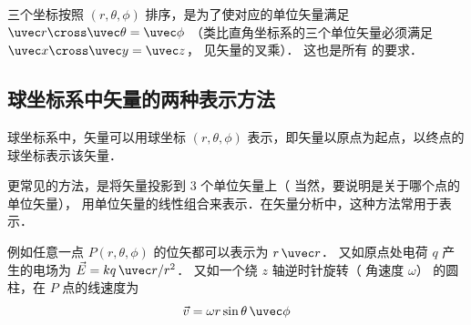 三个坐标按照 $(r, \theta , \phi )$ 排序，是为了使对应的单位矢量满足 $\uvec r \cross \uvec \theta  = \uvec \phi $ （类比直角坐标系的三个单位矢量必须满足 $\uvec x \cross \uvec y = \uvec z$， 见矢量的叉乘）． 这也是所有%
 的要求．
 
\subsection{球坐标系中矢量的两种表示方法}
球坐标系中，矢量可以用球坐标 $(r, \theta, \phi)$ 表示，即矢量以原点为起点，以终点的球坐标表示该矢量．

更常见的方法，是将矢量投影到 3 个单位矢量上（ 当然，要说明是关于哪个点的单位矢量）， 用单位矢量的线性组合来表示．在矢量分析中，这种方法常用于表示．%

例如任意一点 $P(r, \theta, \phi)$ 的位矢都可以表示为 $r\,\uvec r$． 又如原点处电荷 $q$ 产生的电场为 $\vec E = k q \,\uvec r/r^2$． 又如一个绕 $z$ 轴逆时针旋转（ 角速度 $\omega $） 的圆柱，在 $P$ 点的线速度为
\begin{equation}
\vec v = \omega r\sin \theta \,\uvec \phi 
\end{equation}










